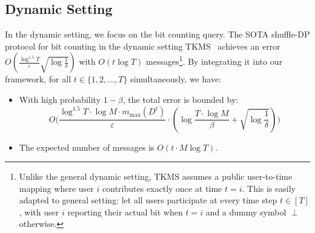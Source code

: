 
\subsection{Dynamic Setting}
In the dynamic setting, we focus on the bit counting query.
The SOTA shuffle-DP protocol for bit counting in the dynamic setting TKMS~\cite{pmlr-v202-tenenbaum23a} achieves an error 
$O(\frac{\log^{1.5}T}{\varepsilon}\sqrt{\log \frac{1}{\delta}})$
with $O(t\log T)$ messages\footnote{Unlike the general dynamic setting, TKMS assumes a public user-to-time mapping where user $i$ contributes exactly once at time $t=i$. 
This is easily adapted to general setting: let all users participate at every time step $t\in[T]$, with user $i$ reporting their actual bit when $t=i$ and a dummy symbol $\perp$ otherwise.}.
By integrating it into our framework, for all $t\in \{1,2,\dots,T\}$ simultaneously, we have:
\begin{itemize}
    \item With high probability $1-\beta$, the total error is bounded by: 
    \[
    O\Big(
    \frac{\log ^{1.5} T \cdot \log M \cdot m_{\max}(D^t)}{\varepsilon} \cdot (\log \frac{T \cdot \log M}{\beta}+\sqrt{\log\frac{1}{\delta}})
    \Big)
    \]
    \item The expected number of messages is $O( t\cdot M\log T)$.
\end{itemize}

